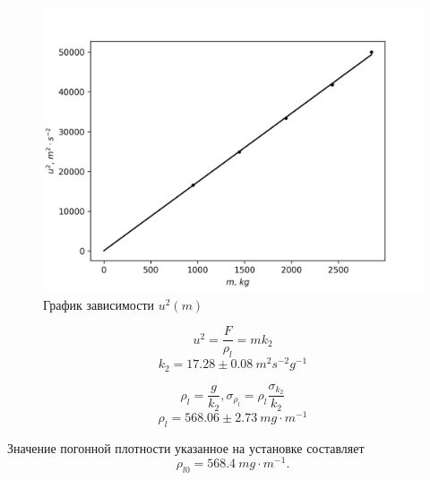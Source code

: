 \documentclass[14pt, a4paper]{article}
\begin{document}
\begin{figure}[!h]
\centering
\includegraphics[scale=0.55]{laba7_2.png}
\caption{График зависимости $u^2(m)$}
\end{figure}

\[u^2=\frac{F}{\rho_l}=mk_2\]
\[k_2=17.28\pm0.08\ m^2s^{-2}g^{-1}\]

\[\rho_l=\frac{g}{k_2}, \sigma_{\rho_l}=\rho_l\frac{\sigma_{k_2}}{k_2}\]
\[\rho_l=568.06\pm2.73\ mg\cdot m^{-1}\]

Значение погонной плотности указанное на установке составляет 
\[\rho_{l0}=568.4\ mg\cdot m^{-1}.\]
\end{document}
